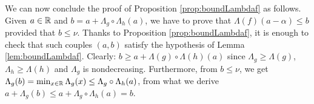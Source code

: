 \documentclass{sig-alternate}
\begin{document}

We can now conclude the proof of Proposition \ref{prop:boundLambdaf} as 
follows. Given $a \in \mathbb R$ and $b = a + \Lambda_g \circ \Lambda_h(a)$, we 
have to prove that $\Lambda(f)(a-\alpha) \leq b$ provided that $b \leq 
\nu$. Thanks to Proposition \ref{prop:boundLambdaf}, it is enough to 
check that such couples $(a,b)$ satisfy the hypothesis of Lemma
\ref{lem:boundLambdaf}. Clearly:
$b \geq a + \Lambda(g) \circ \Lambda(h)(a)$
since $\Lambda_g \geq \Lambda(g)$, $\Lambda_h \geq \Lambda(h)$ and
$\Lambda_g$ is nondecreasing. Furthermore, from $b \leq \nu$, we get
$\Lambda_g(b) = \min_{x \in \mathbb R} \Lambda_g(x) \leq \Lambda_g \circ 
\Lambda_h(a)$, from what we derive 
$a + \Lambda_g(b) \leq a + \Lambda_g \circ \Lambda_h(a) = b$.



\end{document}
